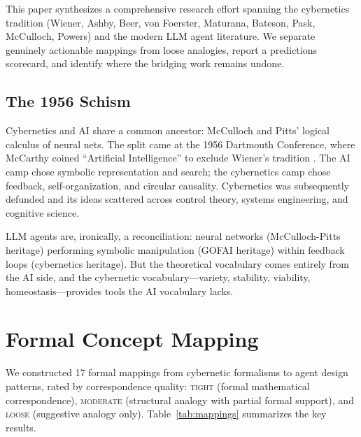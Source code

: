 \documentclass[11pt]{article}
\begin{document}
This paper synthesizes a comprehensive research effort spanning the cybernetics tradition (Wiener, Ashby, Beer, von Foerster, Maturana, Bateson, Pask, McCulloch, Powers) and the modern LLM agent literature. We separate genuinely actionable mappings from loose analogies, report a predictions scorecard, and identify where the bridging work remains undone.

\subsection{The 1956 Schism}

Cybernetics and AI share a common ancestor: McCulloch and Pitts' \citeyear{mcculloch1943logical} logical calculus of neural nets. The split came at the 1956 Dartmouth Conference, where McCarthy coined ``Artificial Intelligence'' to exclude Wiener's tradition \cite{pickering2010cybernetic}. The AI camp chose symbolic representation and search; the cybernetics camp chose feedback, self-organization, and circular causality. Cybernetics was subsequently defunded and its ideas scattered across control theory, systems engineering, and cognitive science.

LLM agents are, ironically, a reconciliation: neural networks (McCulloch-Pitts heritage) performing symbolic manipulation (GOFAI heritage) within feedback loops (cybernetics heritage). But the theoretical vocabulary comes entirely from the AI side, and the cybernetic vocabulary---variety, stability, viability, homeostasis---provides tools the AI vocabulary lacks.

\section{Formal Concept Mapping}

We constructed 17 formal mappings from cybernetic formalisms to agent design patterns, rated by correspondence quality: \textsc{tight} (formal mathematical correspondence), \textsc{moderate} (structural analogy with partial formal support), and \textsc{loose} (suggestive analogy only). Table~\ref{tab:mappings} summarizes the key results.
\end{document}

